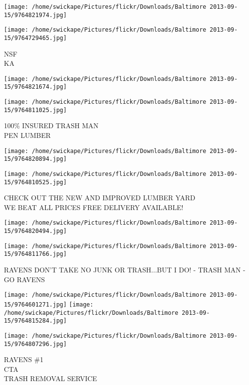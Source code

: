 \documentclass[10pt,letterpaper]{article}
\begin{document}
\texttt{[image: /home/swickape/Pictures/flickr/Downloads/Baltimore 2013-09-15/9764821974.jpg]}

\vspace{0.25in}
\texttt{[image: /home/swickape/Pictures/flickr/Downloads/Baltimore 2013-09-15/9764729465.jpg]}

NSF\\
KA
\pagebreak

\texttt{[image: /home/swickape/Pictures/flickr/Downloads/Baltimore 2013-09-15/9764821674.jpg]}

\vspace{0.25in}
\texttt{[image: /home/swickape/Pictures/flickr/Downloads/Baltimore 2013-09-15/9764811025.jpg]}

100\% INSURED TRASH MAN\\
PEN LUMBER
\pagebreak

\texttt{[image: /home/swickape/Pictures/flickr/Downloads/Baltimore 2013-09-15/9764820894.jpg]}

\vspace{0.25in}
\texttt{[image: /home/swickape/Pictures/flickr/Downloads/Baltimore 2013-09-15/9764810525.jpg]}

CHECK OUT THE NEW AND IMPROVED LUMBER YARD\\
WE BEAT ALL PRICES FREE DELIVERY AVAILABLE!
\pagebreak

\texttt{[image: /home/swickape/Pictures/flickr/Downloads/Baltimore 2013-09-15/9764820494.jpg]}

\vspace{0.25in}
\texttt{[image: /home/swickape/Pictures/flickr/Downloads/Baltimore 2013-09-15/9764811766.jpg]}

RAVENS DON'T TAKE NO JUNK OR TRASH...BUT I DO!  {-} TRASH MAN {-}\\
GO RAVENS
\pagebreak

\texttt{[image: /home/swickape/Pictures/flickr/Downloads/Baltimore 2013-09-15/9764601271.jpg]}
\texttt{[image: /home/swickape/Pictures/flickr/Downloads/Baltimore 2013-09-15/9764815284.jpg]}

\vspace{0.25in}
\texttt{[image: /home/swickape/Pictures/flickr/Downloads/Baltimore 2013-09-15/9764807296.jpg]}

RAVENS \#1\\
CTA\\
TRASH REMOVAL SERVICE
\pagebreak
\end{document}
